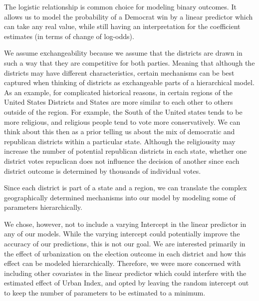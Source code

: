 \documentclass[12pt]{article}
\begin{document}
The logistic relationship is common choice for modeling binary outcomes. It allows us to model the probability of a Democrat win by a linear predictor which can take any real value, while still having an interpretation for the coefficient estimates (in terms of change of log-odds).


We assume exchangeability because we assume that the districts are drawn in such a way that they are competitive for both parties. Meaning that although the districts may have different characteristics, certain mechanisms can be best captured when thinking of districts as exchangeable parts of  a hierarchical model. 
As an example, for complicated historical reasons, in certain regions of the United States Districts and States are more similar to each other to others outside of the region. For example, the South of the United states tends to be more religious, and religious people tend to vote more conservatively. We can think about this then as a prior telling us about the mix of democratic and republican districts within a particular state. Although the religiousity may increase the number of potential republican districts in each state, whether one district votes repuclican does not influence the decision of another since each district outcome is determined by thousands of individual votes. 

Since each district is part of a state and a region, we can translate the complex geographically determined mechanisms into our model by modeling some of parameters hierarchically.



We chose, however, not to include a varying Intercept in the linear predictor in any of our models. While the varying intercept could potentially improve the accuracy of our predictions, this is not our goal. We are interested primarily in the effect of urbanization on the election outcome in each district and how this effect can be modeled hierarchically. Therefore, we were more concerned with including other covariates in the linear predictor which could interfere with the estimated effect of Urban Index, and opted by leaving the random intercept out to keep the number of parameters to be estimated to a minimum.

\end{document}
